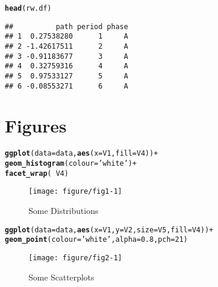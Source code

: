 \documentclass{article}\usepackage[]{graphicx}\usepackage[]{color}
\makeatletter
\def\maxwidth{ %
  \ifdim\Gin@nat@width>\linewidth
    \linewidth
  \else
    \Gin@nat@width
  \fi
}
\newcommand{\hlnum}[1]{\textcolor[rgb]{0.686,0.059,0.569}{#1}}%
\newcommand{\hlstr}[1]{\textcolor[rgb]{0.192,0.494,0.8}{#1}}%
\newcommand{\hlopt}[1]{\textcolor[rgb]{0,0,0}{#1}}%
\newcommand{\hlstd}[1]{\textcolor[rgb]{0.345,0.345,0.345}{#1}}%
\newcommand{\hlkwc}[1]{\textcolor[rgb]{0.333,0.667,0.333}{#1}}%
\newcommand{\hlkwd}[1]{\textcolor[rgb]{0.737,0.353,0.396}{\textbf{#1}}}%
\newenvironment{kframe}{%
 \def\at@end@of@kframe{}%
 \ifinner\ifhmode%
  \def\at@end@of@kframe{\end{minipage}}%
  \begin{minipage}{\columnwidth}%
 \fi\fi%
 \def\FrameCommand##1{\hskip\@totalleftmargin \hskip-\fboxsep
 \colorbox{shadecolor}{##1}\hskip-\fboxsep
     \hskip-\linewidth \hskip-\@totalleftmargin \hskip\columnwidth}%
 \MakeFramed {\advance\hsize-\width
   \@totalleftmargin\z@ \linewidth\hsize
   \@setminipage}}%
 {\par\unskip\endMakeFramed%
 \at@end@of@kframe}
\newenvironment{knitrout}{}{} %
\makeatother
\begin{document}
\begin{knitrout}
\color{fgcolor}\begin{kframe}
\begin{alltt}
\hlkwd{head}\hlstd{(rw.df)}
\end{alltt}
\begin{verbatim}
##          path period phase
## 1  0.27538280      1     A
## 2 -1.42617511      2     A
## 3 -0.91183677      3     A
## 4  0.32759316      4     A
## 5  0.97533127      5     A
## 6 -0.08553271      6     A
\end{verbatim}
\end{kframe}
\end{knitrout}

\clearpage
\section{Figures}

\begin{knitrout}
\color{fgcolor}\begin{kframe}
\begin{alltt}
\hlkwd{ggplot}\hlstd{(}\hlkwc{data} \hlstd{= data,} \hlkwd{aes}\hlstd{(}\hlkwc{x} \hlstd{= V1,} \hlkwc{fill} \hlstd{= V4))} \hlopt{+}
  \hlkwd{geom_histogram}\hlstd{(}\hlkwc{colour} \hlstd{=} \hlstr{'white'}\hlstd{)} \hlopt{+}
  \hlkwd{facet_wrap}\hlstd{(}\hlopt{~} \hlstd{V4)}
\end{alltt}
\end{kframe}\begin{figure}[ht]

{\centering \texttt{[image: figure/fig1-1]} 

}

\caption[Some Distributions]{Some Distributions}\label{fig:fig1}
\end{figure}


\end{knitrout}

\begin{knitrout}
\color{fgcolor}\begin{kframe}
\begin{alltt}
\hlkwd{ggplot}\hlstd{(}\hlkwc{data} \hlstd{= data,} \hlkwd{aes}\hlstd{(}\hlkwc{x} \hlstd{= V1,} \hlkwc{y} \hlstd{= V2,} \hlkwc{size} \hlstd{= V5,} \hlkwc{fill} \hlstd{= V4))} \hlopt{+}
  \hlkwd{geom_point}\hlstd{(}\hlkwc{colour} \hlstd{=} \hlstr{'white'}\hlstd{,} \hlkwc{alpha} \hlstd{=} \hlnum{0.8}\hlstd{,} \hlkwc{pch} \hlstd{=} \hlnum{21}\hlstd{)}
\end{alltt}
\end{kframe}\begin{figure}[ht]

{\centering \texttt{[image: figure/fig2-1]} 

}

\caption[Some Scatterplots]{Some Scatterplots}\label{fig:fig2}
\end{figure}


\end{knitrout}
\end{document}
